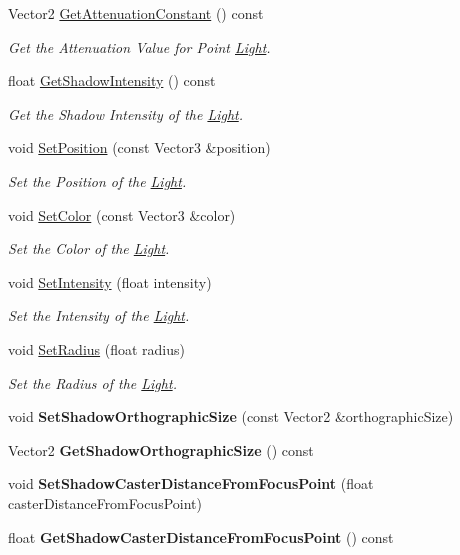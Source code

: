 \begin{DoxyCompactItemize}
Vector2 \hyperlink{classLight_abf1be47f811217845e2381fd01e01c6d}{Get\+Attenuation\+Constant} () const
\begin{DoxyCompactList}\small\item\em Get the Attenuation Value for Point \hyperlink{classLight}{Light}. \end{DoxyCompactList}\item 
float \hyperlink{classLight_af2cd275417fec333fecadb28180805ca}{Get\+Shadow\+Intensity} () const
\begin{DoxyCompactList}\small\item\em Get the Shadow Intensity of the \hyperlink{classLight}{Light}. \end{DoxyCompactList}\item 
void \hyperlink{classLight_a9163be3eb36a2bee3d80664afff48a6a}{Set\+Position} (const Vector3 \&position)
\begin{DoxyCompactList}\small\item\em Set the Position of the \hyperlink{classLight}{Light}. \end{DoxyCompactList}\item 
void \hyperlink{classLight_a1930e36520d82d4d82779c66bba28734}{Set\+Color} (const Vector3 \&color)
\begin{DoxyCompactList}\small\item\em Set the Color of the \hyperlink{classLight}{Light}. \end{DoxyCompactList}\item 
void \hyperlink{classLight_a13d3927b9123987a5151f63d5d4c3fc4}{Set\+Intensity} (float intensity)
\begin{DoxyCompactList}\small\item\em Set the Intensity of the \hyperlink{classLight}{Light}. \end{DoxyCompactList}\item 
void \hyperlink{classLight_a304fff5378538a07af88b77a0fee81fe}{Set\+Radius} (float radius)
\begin{DoxyCompactList}\small\item\em Set the Radius of the \hyperlink{classLight}{Light}. \end{DoxyCompactList}\item 
\mbox{\label{classLight_a582c2ac8c912ef5c3301cf798e335835}} 
void {\bfseries Set\+Shadow\+Orthographic\+Size} (const Vector2 \&orthographic\+Size)
\item 
\mbox{\label{classLight_a147e85a639e8f1cb33e7be1093759189}} 
Vector2 {\bfseries Get\+Shadow\+Orthographic\+Size} () const
\item 
\mbox{\label{classLight_ac5aa387959569c60efbfdbefe56c1e6a}} 
void {\bfseries Set\+Shadow\+Caster\+Distance\+From\+Focus\+Point} (float caster\+Distance\+From\+Focus\+Point)
\item 
\mbox{\label{classLight_a33f170b88c3a2a829ccccda82715b80c}} 
float {\bfseries Get\+Shadow\+Caster\+Distance\+From\+Focus\+Point} () const
\end{DoxyCompactItemize}
